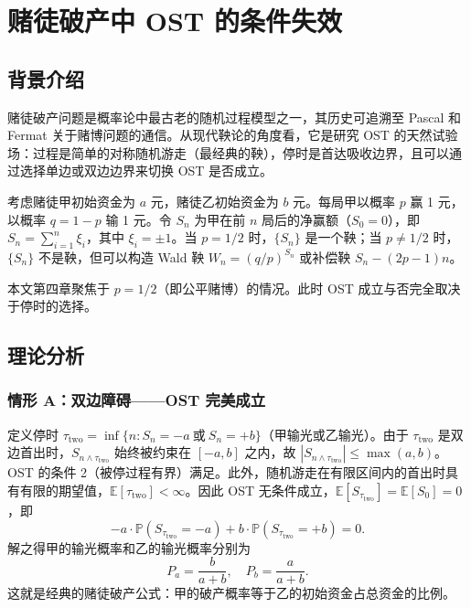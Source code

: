 \section{赌徒破产中 OST 的条件失效}

\subsection{背景介绍}

赌徒破产问题是概率论中最古老的随机过程模型之一，其历史可追溯至 Pascal 和 Fermat 关于赌博问题的通信\cite{feller1968introduction}。从现代鞅论的角度看，它是研究 OST 的天然试验场：过程是简单的对称随机游走（最经典的鞅），停时是首达吸收边界，且可以通过选择单边或双边边界来切换 OST 是否成立。

考虑赌徒甲初始资金为 $a$ 元，赌徒乙初始资金为 $b$ 元。每局甲以概率 $p$ 赢 1 元，以概率 $q = 1-p$ 输 1 元。令 $S_n$ 为甲在前 $n$ 局后的净赢额（$S_0 = 0$），即 $S_n = \sum_{i=1}^{n} \xi_i$，其中 $\xi_i = \pm 1$。当 $p = 1/2$ 时，$\{S_n\}$ 是一个鞅；当 $p \neq 1/2$ 时，$\{S_n\}$ 不是鞅，但可以构造 Wald 鞅 $W_n = (q/p)^{S_n}$ 或补偿鞅 $S_n - (2p-1)n$。

本文第四章聚焦于 $p = 1/2$（即公平赌博）的情况。此时 OST 成立与否完全取决于停时的选择。

\subsection{理论分析}

\subsubsection{情形 A：双边障碍——OST 完美成立}

定义停时 $\tau_{\text{two}} = \inf\{n: S_n = -a\ \text{或}\ S_n = +b\}$（甲输光或乙输光）。由于 $\tau_{\text{two}}$ 是双边首出时，$S_{n \wedge \tau_{\text{two}}}$ 始终被约束在 $[-a, b]$ 之内，故 $|S_{n \wedge \tau_{\text{two}}}| \leqslant \max(a, b)$。OST 的条件 2（被停过程有界）满足。此外，随机游走在有限区间内的首出时具有有限的期望值，$\mathbb{E}[\tau_{\text{two}}] < \infty$。因此 OST 无条件成立，$\mathbb{E}[S_{\tau_{\text{two}}}] = \mathbb{E}[S_0] = 0$，即
\begin{equation}\label{eq:gambler_ost}
  -a \cdot \mathbb{P}(S_{\tau_{\text{two}}} = -a) + b \cdot \mathbb{P}(S_{\tau_{\text{two}}} = +b) = 0.
\end{equation}
解之得甲的输光概率和乙的输光概率分别为
\begin{equation}\label{eq:gambler_prob}
  P_a = \frac{b}{a+b}, \quad P_b = \frac{a}{a+b}.
\end{equation}
这就是经典的赌徒破产公式：甲的破产概率等于乙的初始资金占总资金的比例。


